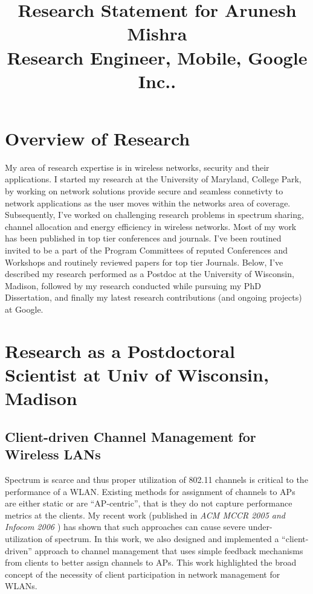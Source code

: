 \documentclass[11pt,letterpaper]{article}
\title{
\vspace{-2cm}Research Statement for Arunesh Mishra\\
{\large Research Engineer, Mobile, Google Inc..}}
\begin{document}
\date{}
\maketitle
\vspace{-1cm}

\section*{Overview of Research}
My area of research expertise is in wireless networks, security and their applications. I started my research at the
University of Maryland, College Park, by working on network solutions provide secure and seamless connetivty to network
applications as the user moves within the networks area of coverage. Subsequently, I've worked on challenging
research problems in spectrum sharing, channel allocation and energy efficiency in wireless networks. Most of my work
has been published in top tier conferences and journals. I've been routined invited to be a part of the Program 
Committees of reputed Conferences and Workshops and routinely reviewed papers for top tier Journals. Below, I've
described my research performed as a Postdoc at the University of Wisconsin, Madison, followed by my research conducted
while pursuing my PhD Dissertation, and finally my latest research contributions (and ongoing projects) at Google.

\section*{Research as a Postdoctoral Scientist at Univ of Wisconsin, Madison}
\subsection*{Client-driven Channel Management for Wireless LANs} Spectrum is scarce and thus proper utilization of 802.11
channels is critical to the performance of a WLAN. Existing methods for assignment of channels to APs are either static
or are ``AP-centric'', that is they do not capture performance metrics at the clients. My recent work (published 
in {\it ACM MCCR 2005 \cite{graph2005} and Infocom 2006 \cite{infocom2006}}) has shown that such approaches can cause severe
under-utilization of spectrum. In this work, we also designed and implemented a ``client-driven'' approach to channel
management  that uses simple feedback mechanisms from clients to better assign channels to APs. This work highlighted
the broad concept of the necessity of client participation in network management for WLANs.
\end{document}
